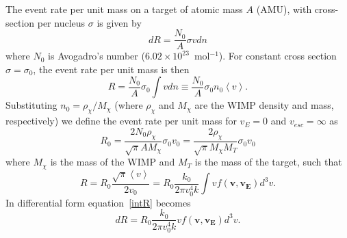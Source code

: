 The event rate per unit mass on a target of atomic mass $A$ (AMU), with cross-section per nucleus $\sigma$ is given by
\begin{equation}
dR=\frac{N_0}{A} \sigma v dn
\end{equation}
where $N_0$ is Avogadro's number ($6.02\times10^{23} $~mol$^{-1}$).  For constant cross section $\sigma=\sigma_0$, the event rate per unit mass is then
\begin{equation}
R=\frac{N_0}{A}\sigma_0 \int v dn \equiv \frac{N_0}{A}\sigma_0n_0\left\langle v\right\rangle .
\end{equation}
Substituting $n_0=\rho_{\chi} / M_{\chi}$ (where $\rho_{\chi}$ and $M_{\chi}$ are the WIMP density and mass, respectively) we define the event rate per unit mass for $v_E=0$ and $v_{esc}=\infty$ as
\begin{equation} \label{R-not}
R_0=\frac{2 N_0 \rho_{\chi}}{\sqrt{\pi} A M_{\chi}} \sigma_0 v_0 = \frac{2 \rho_{\chi} }{\sqrt{\pi} M_{\chi} M_T} \sigma_0 v_0
\end{equation}
where $M_\chi$ is the mass of the WIMP and $M_T$ is the mass of the target, such that 
\begin{equation} \label{intR}
R=R_0 \frac{\sqrt{\pi} \left \langle v \right \rangle}{2 v_0} = R_0 \frac{k_0}{2 \pi v_0^4 k} \int v f(\mathbf{v},\mathbf{v_E}) d^3v.
\end{equation}
In differential form equation~\ref{intR} becomes
\begin{equation} \label{diffR}
dR = R_0 \frac{k_0}{2 \pi v_0^4 k} v f(\mathbf{v},\mathbf{v_E}) d^3v.
\end{equation}

